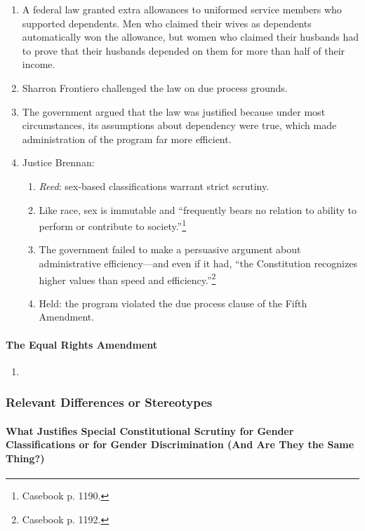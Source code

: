 \begin{enumerate}
    \item A federal law granted extra allowances to uniformed service members 
    who supported dependents. Men who claimed their wives as dependents 
    automatically won the allowance, but women who claimed their husbands 
    had to prove that their husbands depended on them for more than half of 
    their income.
    \item Sharron Frontiero challenged the law on due process grounds.
    \item The government argued that the law was justified because under most 
    circumstances, its assumptions about dependency were true, which made 
    administration of the program far more efficient.
    \item Justice Brennan:
    \begin{enumerate}
        \item \emph{Reed}: sex-based classifications warrant strict scrutiny.
        \item Like race, sex is immutable and ``frequently bears no relation 
        to ability to perform or contribute to society.''\footnote{Casebook p. 
        1190.}
        \item The government failed to make a persuasive argument about 
        administrative efficiency---and even if it had, ``the Constitution 
        recognizes higher values than speed and 
        efficiency.''\footnote{Casebook p. 1192.}
        \item Held: the program violated the due process clause of the Fifth 
        Amendment.
    \end{enumerate}
\end{enumerate}

\paragraph{The Equal Rights Amendment}

\begin{enumerate}
    \item %
\end{enumerate}
 
\subsubsection{Relevant Differences or Stereotypes}

\paragraph{What Justifies Special Constitutional Scrutiny for Gender 
Classifications or for Gender Discrimination (And Are They the Same Thing?)}

